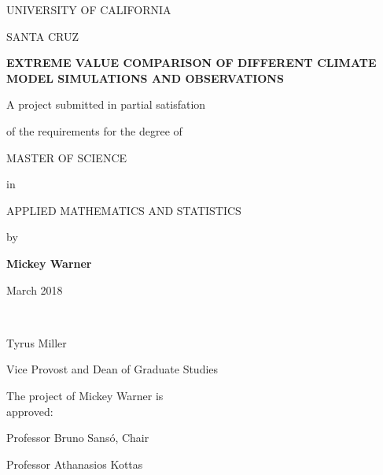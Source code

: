 \thispagestyle{empty} %

\singlespacing

\begin{center}
UNIVERSITY OF CALIFORNIA
\bigskip

SANTA CRUZ
\bigskip
\bigskip
\bigskip

\textbf{EXTREME VALUE COMPARISON OF DIFFERENT CLIMATE MODEL SIMULATIONS AND OBSERVATIONS}
\bigskip
\bigskip
\bigskip

A project submitted in partial satisfation

of the requirements for the degree of
\bigskip
\bigskip

MASTER OF SCIENCE
\bigskip

in
\bigskip

APPLIED MATHEMATICS AND STATISTICS
\bigskip
\bigskip

by
\bigskip
\bigskip

\textbf{Mickey Warner}
\bigskip

March 2018
\bigskip
\bigskip

\end{center}


\begin{multicols*}{2}

\ 

\bigskip
\bigskip
\bigskip
\bigskip
\bigskip
\bigskip
\bigskip
\bigskip
\bigskip
\bigskip
\bigskip
\bigskip
\bigskip
\bigskip
\bigskip
\bigskip
\bigskip


\hline
\bigskip
\noindent Tyrus Miller

\noindent Vice Provost and Dean of Graduate Studies



\noindent The project of Mickey Warner is\\approved:
\bigskip
\bigskip
\bigskip
\bigskip

\hline
\bigskip
\noindent Professor Bruno Sans{\'o}, Chair
\bigskip
\bigskip
\bigskip
\bigskip

\hline
\bigskip
\noindent Professor Athanasios Kottas


\end{multicols*}




\doublespacing

\newpage
